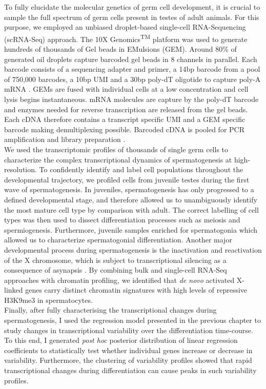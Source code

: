 To fully elucidate the molecular genetics of germ cell development, it is crucial to sample the full spectrum of germ cells present in testes of adult animals. For this purpose, we employed an unbiased droplet-based single-cell RNA-Sequencing (scRNA-Seq) approach. The 10X Genomics\textsuperscript{\small{TM}} platform was used to generate hundreds of thousands of Gel beads in EMulsions (GEM). Around 80\% of generated oil droplets capture barcoded gel beads in 8 channels in parallel. Each barcode consists of a sequencing adapter and primer, a 14bp barcode from a pool of 750,000 barcodes, a 10bp UMI and a 30bp poly-dT oligotide to capture poly-A mRNA \citep{Zheng2017}. GEMs are fused with individual cells at a low concentration and cell lysis begins instantaneous. mRNA molecules are capture by the poly-dT barcode and enzymes needed for reverse transcription are released from the gel beads. Each cDNA therefore contains a transcript specific UMI and a GEM specific barcode making demultiplexing possible. Barcoded cDNA is pooled for PCR amplification and library preparation \citep{Zheng2017}. \\

We used the transcriptomic profiles of thousands of single germ cells to characterize the complex transcriptional dynamics of spermatogenesis at high-resolution. To confidently identify and label cell populations throughout the developmental trajectory, we profiled cells from juvenile testes during the first wave of spermatogenesis. In juveniles, spermatogenesis has only progressed to a defined developmental stage, and therefore allowed us to unambiguously identify the most mature cell type by comparison with adult. The correct labelling of cell types was then used to dissect differentiation processes such as meiosis and spermiogenesis. Furthermore, juvenile samples enriched for spermatogonia which allowed us to characterize spermatogonial differentiation. Another major developmental process during spermatogenesis is the inactivation and reactivation of the X chromosome, which is subject to transcriptional silencing as a consequence of asynapsis \citep{Turner2007}. By combining bulk and single-cell RNA-Seq approaches with chromatin profiling, we identified that \textit{de novo} activated X-linked genes carry distinct chromatin signatures with high levels of repressive H3K9me3 in spermatocytes. \\

Finally, after fully characterising the transcriptional changes during spermatogenesis, I used the regression model presented in the previous chapter to study changes in transcriptional variability over the differentiation time-course. To this end, I generated \emph{post hoc} posterior distribution of linear regression coefficients to statistically test whether individual genes increase or decrease in variability. Furthermore, the clustering of variability profiles showed that rapid transcriptional changes during differentiation can cause peaks in such variability profiles.\\

